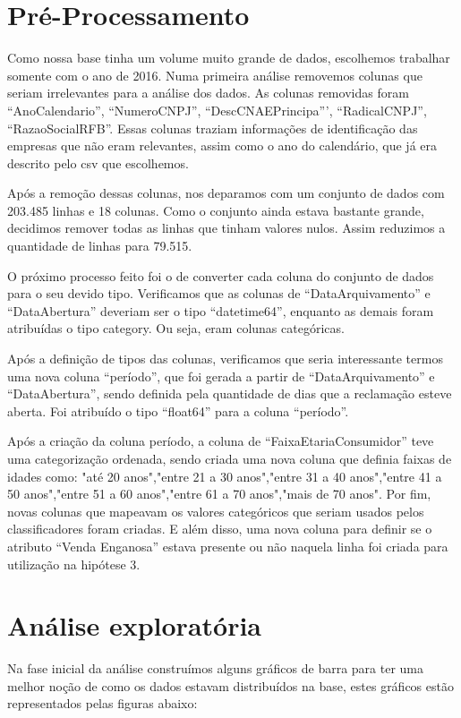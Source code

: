 \documentclass[review]{elsarticle}
\begin{document}
\section{Pré-Processamento}
    Como nossa base tinha um volume muito grande de dados, escolhemos trabalhar somente com o ano de 2016. Numa primeira análise removemos colunas que seriam irrelevantes para a análise dos dados. As colunas removidas foram “AnoCalendario”, “NumeroCNPJ”, “DescCNAEPrincipa”', “RadicalCNPJ”, “RazaoSocialRFB”. Essas colunas traziam informações de identificação das empresas que não eram relevantes, assim como o ano do calendário, que já era descrito pelo csv que escolhemos.

	Após a remoção dessas colunas, nos deparamos com um conjunto de dados com 203.485 linhas e 18 colunas. Como o conjunto ainda estava bastante grande, decidimos remover todas as linhas que tinham valores nulos. Assim reduzimos a quantidade de linhas para 79.515.
	
	O próximo processo feito foi o de converter cada coluna do conjunto de dados para o seu devido tipo. Verificamos que as colunas de “DataArquivamento” e “DataAbertura” deveriam ser o tipo “datetime64”, enquanto as demais foram atribuídas o tipo category. Ou seja, eram colunas categóricas.
	
	Após a definição de tipos das colunas, verificamos que seria interessante termos uma nova coluna “período”, que foi gerada a partir de “DataArquivamento” e “DataAbertura”, sendo definida pela quantidade de dias que a reclamação esteve aberta. Foi atribuído o tipo “float64” para a coluna “período”.
	
	Após a criação da coluna período, a coluna de “FaixaEtariaConsumidor” teve uma categorização ordenada, sendo criada uma nova coluna que definia faixas de idades como: "até 20 anos","entre 21 a 30 anos","entre 31 a 40 anos","entre 41 a 50 anos","entre 51 a 60 anos","entre 61 a 70 anos","mais de 70 anos".
	Por fim, novas colunas que mapeavam os valores categóricos que seriam usados pelos classificadores foram criadas. E além disso, uma nova coluna para definir se o atributo “Venda Enganosa” estava presente ou não naquela linha foi criada para utilização na hipótese 3.

\section{Análise exploratória}

    Na fase inicial da análise construímos alguns gráficos de barra para ter uma melhor noção de como os dados estavam distribuídos na base, estes gráficos estão representados pelas figuras abaixo:
\end{document}
